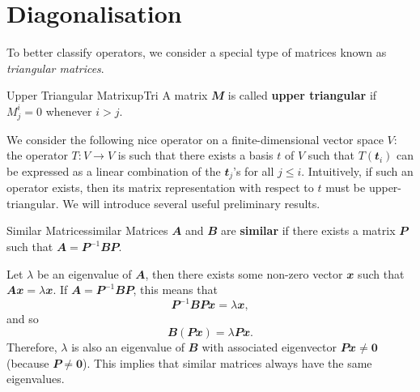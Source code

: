 \documentclass[math, code]{amznotes}
\theoremstyle{remark}
\newcommand{\zero}{\mathbf{0}}
\begin{document}
\section{Diagonalisation}
To better classify operators, we consider a special type of matrices known as \textit{triangular matrices}.
\begin{dfnbox}{Upper Triangular Matrix}{upTri}
    A matrix $\mathbfit{M}$ is called {\color{red} \textbf{upper triangular}} if $M^i_j = 0$ whenever $i > j$.
\end{dfnbox}
We consider the following nice operator on a finite-dimensional vector space $V$: the operator $T \colon V \to V$ is such that there exists a basis $t$ of $V$ such that $T(\mathbfit{t}_i)$ can be expressed as a linear combination of the $\mathbfit{t}_j$'s for all $j \leq i$. Intuitively, if such an operator exists, then its matrix representation with respect to $t$ must be upper-triangular. We will introduce several useful preliminary results.
\begin{dfnbox}{Similar Matrices}{similar}
    Matrices $\mathbfit{A}$ and $\mathbfit{B}$ are {\color{red} \textbf{similar}} if there exists a matrix $\mathbfit{P}$ such that $\mathbfit{A} = \mathbfit{P}^{-1}\mathbfit{B}\mathbfit{P}$.
\end{dfnbox}
Let $\lambda$ be an eigenvalue of $\mathbfit{A}$, then there exists some non-zero vector $\mathbfit{x}$ such that $\mathbfit{Ax} = \lambda\mathbfit{x}$. If $\mathbfit{A} = \mathbfit{P}^{-1}\mathbfit{B}\mathbfit{P}$, this means that 
\begin{equation*}
    \mathbfit{P}^{-1}\mathbfit{B}\mathbfit{P}\mathbfit{x} = \lambda\mathbfit{x},
\end{equation*}
and so 
\begin{equation*}
    \mathbfit{B}(\mathbfit{Px}) = \lambda\mathbfit{Px}.
\end{equation*}
Therefore, $\lambda$ is also an eigenvalue of $\mathbfit{B}$ with associated eigenvector $\mathbfit{Px} \neq \zero$ (because $\mathbfit{P} \neq \zero$). This implies that similar matrices always have the same eigenvalues.
\end{document}

